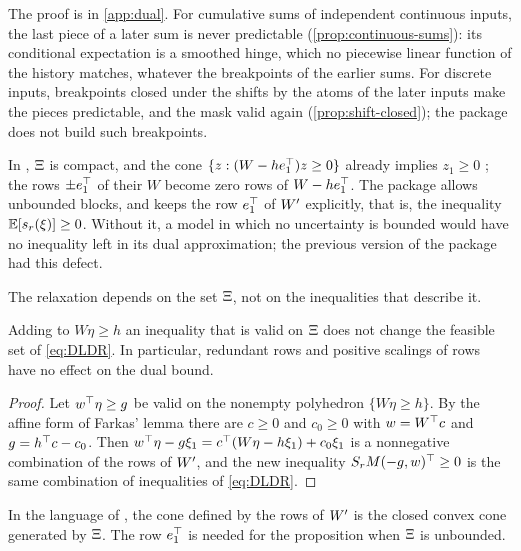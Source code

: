 The proof is in \cref{app:dual}.
For cumulative sums of independent continuous inputs, the last piece of a later sum is never predictable (\cref{prop:continuous-sums}):
its conditional expectation is a smoothed hinge, which no piecewise linear function of the history matches, whatever the breakpoints of the earlier sums.
For discrete inputs, breakpoints closed under the shifts by the atoms of the later inputs make the pieces predictable, and the mask valid again (\cref{prop:shift-closed});
the package does not build such breakpoints.

\begin{remark}
\label{rem:e1-row}
In \citet{KWG2011}, $\Xi$ is compact, and the cone $\{z : (W - he_1^\top)z \ge 0\}$ already implies $z_1 \ge 0$ \citep[proof of Proposition~3]{KWG2011};
the rows $\pm e_1^\top$ of their $W$ become zero rows of $W - he_1^\top$.
The package allows unbounded blocks, and keeps the row $e_1^\top$ of $W'$ explicitly,
that is, the inequality $\mathbb{E}[s_r(\xi)] \ge 0$.
Without it, a model in which no uncertainty is bounded would have no inequality left in its dual approximation;
the previous version of the package had this defect.
\end{remark}

The relaxation depends on the set $\Xi$, not on the inequalities that describe it.

\begin{proposition}
\label{prop:description}
Adding to $W\eta \ge h$ an inequality that is valid on $\Xi$ does not change the feasible set of \eqref{eq:DLDR}.
In particular, redundant rows and positive scalings of rows have no effect on the dual bound.
\end{proposition}

\begin{proof}
Let $w^\top\eta \ge g$ be valid on the nonempty polyhedron $\{W\eta \ge h\}$.
By the affine form of Farkas' lemma there are $c \ge 0$ and $c_0 \ge 0$ with $w = W^\top c$ and $g = h^\top c - c_0$.
Then $w^\top\eta - g\xi_1 = c^\top(W\eta - h\xi_1) + c_0\xi_1$ is a nonnegative combination of the rows of $W'$,
and the new inequality $S_rM(-g, w)^\top \ge 0$ is the same combination of inequalities of \eqref{eq:DLDR}.
\end{proof}

In the language of \citet[Proposition~3]{KWG2011}, the cone defined by the rows of $W'$ is the closed convex cone generated by $\Xi$.
The row $e_1^\top$ is needed for the proposition when $\Xi$ is unbounded.

